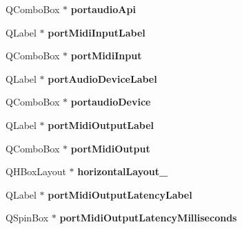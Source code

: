 \begin{DoxyCompactItemize}
\item 
\mbox{\label{class_ui___prefs_dialog_base_af0f7377aa9d354d41185be412d5f46e6}} 
Q\+Combo\+Box $\ast$ {\bfseries portaudio\+Api}
\item 
\mbox{\label{class_ui___prefs_dialog_base_a158a1b7a08b3c3fa2ed91d79b530e2b5}} 
Q\+Label $\ast$ {\bfseries port\+Midi\+Input\+Label}
\item 
\mbox{\label{class_ui___prefs_dialog_base_a8a89531ae80b5c60abeb5768577f4ea6}} 
Q\+Combo\+Box $\ast$ {\bfseries port\+Midi\+Input}
\item 
\mbox{\label{class_ui___prefs_dialog_base_a8df2071dcf848dad33b543d9ca2a548e}} 
Q\+Label $\ast$ {\bfseries port\+Audio\+Device\+Label}
\item 
\mbox{\label{class_ui___prefs_dialog_base_a07726681b41d9a489269ff37f355b3e0}} 
Q\+Combo\+Box $\ast$ {\bfseries portaudio\+Device}
\item 
\mbox{\label{class_ui___prefs_dialog_base_a3d7590f4515e0742eba155a89889c041}} 
Q\+Label $\ast$ {\bfseries port\+Midi\+Output\+Label}
\item 
\mbox{\label{class_ui___prefs_dialog_base_a6c7d6dd8599e9623fbf2f3047112376a}} 
Q\+Combo\+Box $\ast$ {\bfseries port\+Midi\+Output}
\item 
\mbox{\label{class_ui___prefs_dialog_base_a2801c1f15e28473834ffde10b348fab1}} 
Q\+H\+Box\+Layout $\ast$ {\bfseries horizontal\+Layout\+\_}
\item 
\mbox{\label{class_ui___prefs_dialog_base_a5bc7185d16039ca126ab82a448218807}} 
Q\+Label $\ast$ {\bfseries port\+Midi\+Output\+Latency\+Label}
\item 
\mbox{\label{class_ui___prefs_dialog_base_ae5e27d4f6a903672771da7958302be03}} 
Q\+Spin\+Box $\ast$ {\bfseries port\+Midi\+Output\+Latency\+Milliseconds}
\item 

\end{DoxyCompactItemize}

